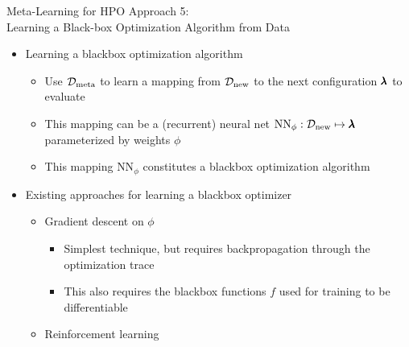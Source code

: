 \begin{frame}[c]{Meta-Learning for HPO Approach 5:\\ Learning a Black-box Optimization Algorithm from Data}

\begin{itemize}
    \item \alert{Learning} a blackbox optimization algorithm
    \begin{itemize}
        \item Use $\mathcal{D}_{\text{meta}}$ to learn a mapping from $\mathcal{D}_{\text{new}}$ to the next configuration $\pmb{\lambda}$ to evaluate
        \item This mapping can be a (recurrent) neural net $\text{NN}_{\phi}: \mathcal{D}_{\text{new}} \mapsto \pmb{\lambda}$ parameterized by weights $\phi$   
\pause        
\smallskip
        \item \alert{This mapping $\text{NN}_{\phi}$ constitutes a blackbox optimization algorithm}


\pause
\bigskip
    
    \end{itemize}
    
    \item Existing approaches for learning a blackbox optimizer

    \begin{itemize}
        \item \alert{Gradient descent} on $\phi$  
        \begin{itemize}
            \item Simplest technique, but requires backpropagation through the optimization trace
            \item This also requires the blackbox functions $f$ used for training to be differentiable
       \end{itemize}
\pause
        \item \alert{Reinforcement learning} 
        \begin{itemize}


\end{itemize}
\end{itemize}
\end{itemize}
\end{frame}
